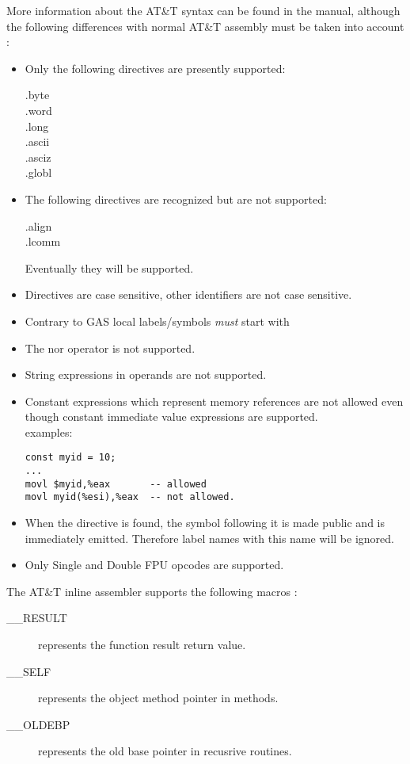 \documentclass{report}
\begin{document}
More information about the AT\&T syntax can be found in the  manual,
although the following differences with normal AT\&T assembly must be taken
into account :
\begin{itemize}
\item  Only the following directives are presently supported:
 \begin{description}
\item[.byte]
\item[.word]
\item[.long]
\item[.ascii]
\item[.asciz]
\item[.globl]
\end{description}
\item  The following directives are recognized but are not
   supported:
\begin{description}
\item[.align]
\item[.lcomm]
\end{description} 
Eventually they will be supported.
\item Directives are case sensitive, other identifiers are not case sensitive.
\item  Contrary to GAS local labels/symbols {\em must} start with 
\item  The nor operator  is not supported.
\item  String expressions in operands are not supported.
\item  Constant expressions which represent memory references are not 
allowed even though constant immediate value expressions are supported. \\
examples:
\begin{verbatim}
const myid = 10;
...
movl $myid,%eax       -- allowed
movl myid(%esi),%eax  -- not allowed.
\end{verbatim}
\item When the  directive is found, the symbol following
    it is made public and is immediately emitted.
    Therefore label names with this name will be ignored.
\item  Only Single and Double FPU opcodes are supported.
\end{itemize} 

The AT\&T inline assembler supports the following macros :
\begin{description}
\item [\_\_RESULT] represents the function result return value.
\item [\_\_SELF]   represents the object method pointer in methods.
\item [\_\_OLDEBP] represents the old base pointer in recusrive routines.
\end{description}
\end{document}
